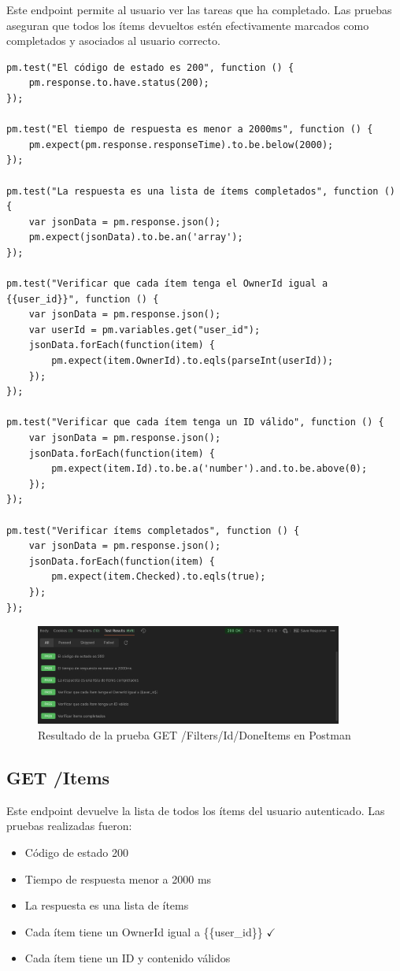 \documentclass{report}
\begin{document}
Este endpoint permite al usuario ver las tareas que ha completado. Las pruebas aseguran que todos los ítems devueltos estén efectivamente marcados como completados y asociados al usuario correcto.

\begin{lstlisting}
pm.test("El código de estado es 200", function () {
    pm.response.to.have.status(200);
});

pm.test("El tiempo de respuesta es menor a 2000ms", function () {
    pm.expect(pm.response.responseTime).to.be.below(2000);
});

pm.test("La respuesta es una lista de ítems completados", function () {
    var jsonData = pm.response.json();
    pm.expect(jsonData).to.be.an('array');
});

pm.test("Verificar que cada ítem tenga el OwnerId igual a {{user_id}}", function () {
    var jsonData = pm.response.json();
    var userId = pm.variables.get("user_id");
    jsonData.forEach(function(item) {
        pm.expect(item.OwnerId).to.eqls(parseInt(userId));
    });
});

pm.test("Verificar que cada ítem tenga un ID válido", function () {
    var jsonData = pm.response.json();
    jsonData.forEach(function(item) {
        pm.expect(item.Id).to.be.a('number').and.to.be.above(0);
    });
});

pm.test("Verificar ítems completados", function () {
    var jsonData = pm.response.json();
    jsonData.forEach(function(item) {
        pm.expect(item.Checked).to.eqls(true);
    });
});
\end{lstlisting}

\begin{figure}[h!]
    \centering
    \includegraphics[width=0.9\textwidth]{./imgs/tc3postman.png}
    \caption{Resultado de la prueba GET /Filters/Id/DoneItems en Postman}
    \label{fig:tc3postman}
\end{figure}

\subsection{GET /Items}
Este endpoint devuelve la lista de todos los ítems del usuario autenticado. Las pruebas realizadas fueron:
\begin{itemize}
    \item Código de estado 200 \checkmark
    \item Tiempo de respuesta menor a 2000 ms \checkmark
    \item La respuesta es una lista de ítems \checkmark
    \item Cada ítem tiene un OwnerId igual a \{\{user\_id\}\} $\checkmark$
    \item Cada ítem tiene un ID y contenido válidos \checkmark
\end{itemize}
\end{document}

